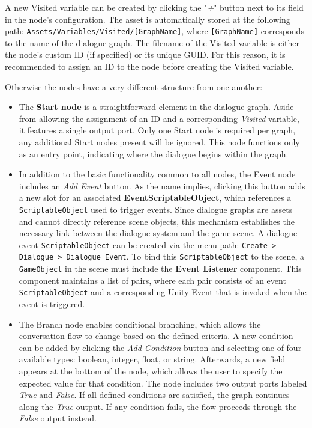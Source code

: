 A new Visited variable can be created by clicking the "\textit{+}" button next to its field in the node's configuration. The asset is automatically stored at the following path: \verb|Assets/Variables/Visited/[GraphName]|, where \verb|[GraphName]| corresponds to the name of the dialogue graph. The filename of the Visited variable is either the node’s custom ID (if specified) or its unique GUID. For this reason, it is recommended to assign an ID to the node before creating the Visited variable.

Otherwise the nodes have a very different structure from one another:

\begin{itemize}
    \item The \textbf{Start node }is a straightforward element in the dialogue graph. Aside from allowing the assignment of an ID and a corresponding \textit{Visited} variable, it features a single output port. Only one Start node is required per graph, any additional Start nodes present will be ignored. This node functions only as an entry point, indicating where the dialogue begins within the graph.
    \item In addition to the basic functionality common to all nodes, the Event node includes an \textit{Add Event} button. As the name implies, clicking this button adds a new slot for an associated \textbf{EventScriptableObject}, which references a \verb|ScriptableObject| used to trigger events. Since dialogue graphs are assets and cannot directly reference scene objects, this mechanism establishes the necessary link between the dialogue system and the game scene. A dialogue event \verb|ScriptableObject| can be created via the menu path: \verb|Create > Dialogue > Dialogue Event|. To bind this \verb|ScriptableObject| to the scene, a \verb|GameObject| in the scene must include the \textbf{Event Listener} component. This component maintains a list of pairs, where each pair consists of an event \verb|ScriptableObject| and a corresponding Unity Event that is invoked when the event is triggered. 
    \item The Branch node enables conditional branching, which allows the conversation flow to change based on the defined criteria. A new condition can be added by clicking the \textit{Add Condition} button and selecting one of four available types: boolean, integer, float, or string. Afterwards, a new field appears at the bottom of the node, which allows the user to specify the expected value for that condition. The node includes two output ports labeled \textit{True} and \textit{False}. If all defined conditions are satisfied, the graph continues along the \textit{True} output. If any condition fails, the flow proceeds through the \textit{False} output instead. 

\end{itemize}
